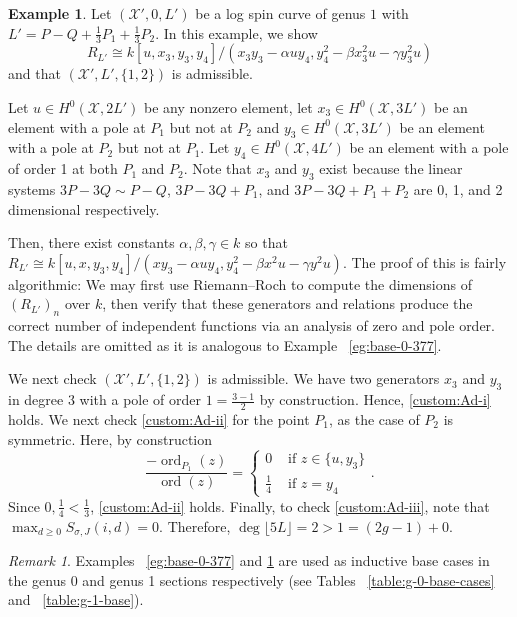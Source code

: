\documentclass{amsart}
\theoremstyle{plain}
\theoremstyle{definition}
\newtheorem{example}[thm]{Example}
\theoremstyle{remark}
\newtheorem{rem}[thm]{Remark}
\numberwithin{equation}{section}
\DeclareMathOperator{\ord}{ord}
\newcommand\sx{\mathscr X}
\newcommand{\halfcan}{L}
\begin{document}
\begin{example}
\label{eg:base-1-33}
Let $(\sx',0 , \halfcan')$ be a log spin curve of genus $1$ with $\halfcan' = P - Q + \frac{1}{3}P_1 + \frac{1}{3}P_2$. In this example, we show
$$R_{\halfcan'} \cong k[u, x_3, y_3, y_4]/(x_3 y_3- \alpha uy_4, y_4^2 - \beta x_3^2 u - \gamma y_3^2u)$$
and that $(\sx', \halfcan', \{1,2\})$ is admissible.

Let $u \in H^0(\sx,2\halfcan')$ be any nonzero element, let $x_3 \in H^0(\sx,3\halfcan')$ be an element with a pole at $P_1$ but not at $P_2$ and $y_3 \in H^0(\sx,3\halfcan')$ be an element with a pole at $P_2$ but not at $P_1$. Let $y_4 \in H^0(\sx,4\halfcan')$ be an element with a pole of order 1 at both $P_1$ and $P_2$. Note that $x_3$ and $y_3$ exist because the linear systems $3P - 3Q \sim P - Q$, $3P - 3Q + P_1$, and $3P - 3Q + P_1 + P_2$ are 0, 1, and 2 dimensional respectively.

Then, there exist constants $\alpha, \beta, \gamma \in k$ so that 
$R_{\halfcan'} \cong k[u, x, y_3, y_4]/(xy_3- \alpha uy_4, y_4^2 - \beta x^2 u - \gamma y^2u).$ The proof of this is fairly algorithmic: We may first use Riemann--Roch to compute the dimensions of $(R_{\halfcan'})_n$ over $k$, then verify that these generators and relations produce the correct number of independent functions via an analysis of zero and pole order. The details are omitted as it is analogous to Example ~\ref{eg:base-0-377}.

We next check $(\sx', \halfcan', \{1,2\})$ is admissible. We have two generators $x_3$ and $y_3$ in degree 3 with a pole of order $1=\frac{3- 1}{2}$ by construction. Hence, \ref{custom:Ad-i} holds. We next check \ref{custom:Ad-ii} for the point $P_1$, as the case of $P_2$ is symmetric. Here, by construction
$$
\frac{-\ord_{P_1}(z)}{\ord(z)} = \begin{cases}
	0 &\text{ if }z \in \{u, y_3\}\\
	\frac{1}{4} &\text{ if }z = y_4
\end{cases}.$$
Since $0, \frac{1}{4} < \frac{1}{3}$, \ref{custom:Ad-ii} holds.
Finally, to check \ref{custom:Ad-iii}, note that $\max_{d \geq 0}S_{\sigma,J}(i,d) = 0.$ Therefore, $\deg \lfloor 5L \rfloor  = 2 > 1 = (2 g - 1) + 0$.
\end{example}

\begin{rem}
\label{rem:base-0-377}
Examples ~\ref{eg:base-0-377} and \ref{eg:base-1-33} are used as inductive base cases in the genus 0 and genus 1 sections respectively (see Tables ~\ref{table:g-0-base-cases} and ~\ref{table:g-1-base}).
\end{rem}
\end{document}
